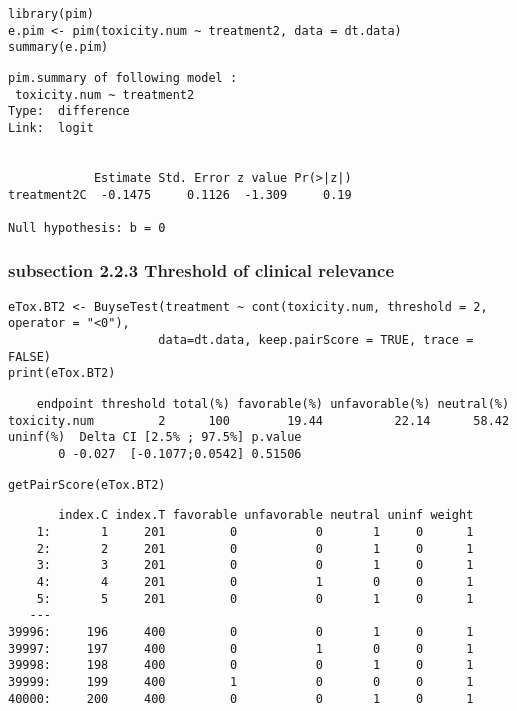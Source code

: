 \documentclass[12pt]{article}
\begin{document}
\lstset{language=r,label= ,caption= ,captionpos=b,numbers=none}
\begin{lstlisting}
library(pim)
e.pim <- pim(toxicity.num ~ treatment2, data = dt.data)
summary(e.pim)
\end{lstlisting}

\begin{verbatim}
pim.summary of following model : 
 toxicity.num ~ treatment2
Type:  difference 
Link:  logit 


            Estimate Std. Error z value Pr(>|z|)
treatment2C  -0.1475     0.1126  -1.309     0.19

Null hypothesis: b = 0
\end{verbatim}

\subsubsection{subsection 2.2.3 Threshold of clinical relevance}
\label{sec:org0c5d5c5}

\lstset{language=r,label= ,caption= ,captionpos=b,numbers=none}
\begin{lstlisting}
eTox.BT2 <- BuyseTest(treatment ~ cont(toxicity.num, threshold = 2, operator = "<0"),
                     data=dt.data, keep.pairScore = TRUE, trace = FALSE)
print(eTox.BT2)
\end{lstlisting}

\begin{verbatim}
    endpoint threshold total(%) favorable(%) unfavorable(%) neutral(%)
toxicity.num         2      100        19.44          22.14      58.42
uninf(%)  Delta CI [2.5% ; 97.5%] p.value
       0 -0.027  [-0.1077;0.0542] 0.51506
\end{verbatim}



\lstset{language=r,label= ,caption= ,captionpos=b,numbers=none}
\begin{lstlisting}
getPairScore(eTox.BT2)
\end{lstlisting}

\begin{verbatim}
       index.C index.T favorable unfavorable neutral uninf weight
    1:       1     201         0           0       1     0      1
    2:       2     201         0           0       1     0      1
    3:       3     201         0           0       1     0      1
    4:       4     201         0           1       0     0      1
    5:       5     201         0           0       1     0      1
   ---                                                           
39996:     196     400         0           0       1     0      1
39997:     197     400         0           1       0     0      1
39998:     198     400         0           0       1     0      1
39999:     199     400         1           0       0     0      1
40000:     200     400         0           0       1     0      1
\end{verbatim}
\end{document}
